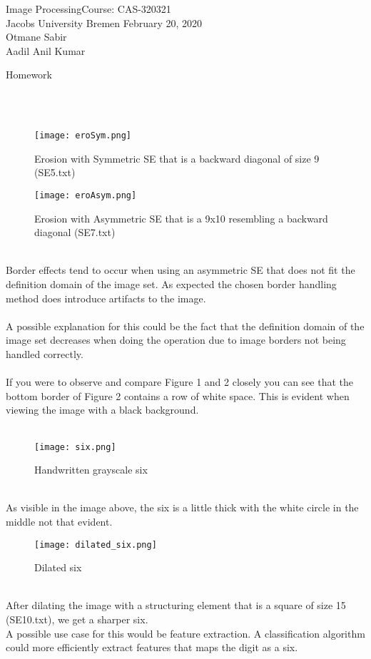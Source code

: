 \documentclass[a4paper]{article}
\newcommand{\coursename}{Image Processing}
\newcommand{\courseno}{CAS-320321}
\newcommand{\sheettitle}{Homework}
\newcommand{\mytoday}{{February 20}, 2020}
\newcounter{assignmentno}
\newcommand{\assignment}{\arabic{assignmentno}}
\begin{document}
\coursename \hfill Course: \courseno\\
Jacobs University Bremen \hfill \mytoday\\
{Otmane Sabir}\hfill \\
{Aadil Anil Kumar}\hfill
\vspace*{0.3cm}\\
\begin{center}
{\Large \sheettitle{} {\assignment}\\}
\end{center}
\\
\large{} \\ 
\begin{figure}[htp]
    \centering
    \texttt{[image: eroSym.png]}
    \caption{Erosion with Symmetric SE that is a backward diagonal of size 9 (SE5.txt)}
    \label{fig:erosionSym}
\end{figure}
\begin{figure}[htp]
    \centering
    \texttt{[image: eroAsym.png]}
    \caption{Erosion with Asymmetric SE that is a 9x10 resembling a backward diagonal (SE7.txt)}
    \label{fig:erosionAsym}
\end{figure} \\
Border effects tend to occur when using an asymmetric SE that does not fit the definition domain of the image set.
As expected the chosen border handling method does introduce artifacts to the image.\\ \\
A possible explanation for this could be the fact that the definition domain of the image set decreases when doing the operation due to image borders not being handled correctly.\\ \\
If you were to observe and compare Figure 1 and 2 closely you can see that the bottom border of Figure 2 contains a row of white space. This is evident when viewing the image with a black background. \\

\newpage
\large{} \\ 
\begin{figure}[htp]
    \centering
    \texttt{[image: six.png]}
    \caption{Handwritten grayscale six}
    \label{fig:erosionSym}
\end{figure}\\
As visible in the image above, the six is a little thick with the white circle in the middle not that evident.
\begin{figure}[htp]
    \centering
    \texttt{[image: dilated\_six.png]}
    \caption{Dilated six}
    \label{fig:erosionAsym}
\end{figure}\\
After dilating the image with a structuring element that is a square of size 15 (SE10.txt), we get a sharper six.\\
A possible use case for this would be feature extraction. A classification algorithm could more efficiently extract features that maps the digit as a six.
\end{document}
